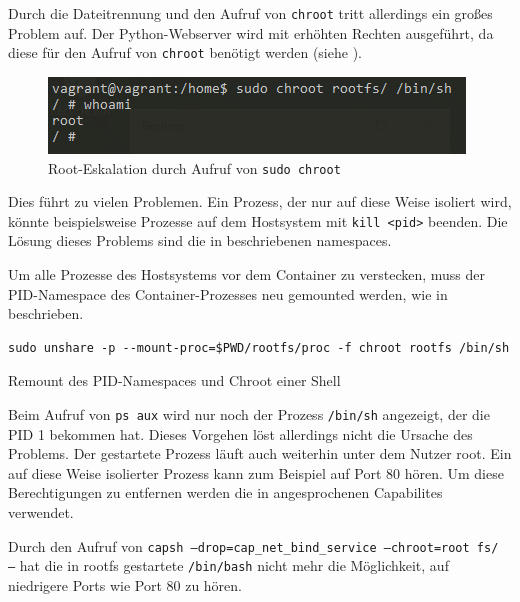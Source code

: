 Durch die Dateitrennung und den Aufruf von \texttt{chroot} tritt allerdings ein großes Problem auf. Der Python-Webserver wird mit erhöhten Rechten ausgeführt, da diese für den Aufruf von \texttt{chroot} benötigt werden (siehe ).

\begin{figure}[h]
	\begin{center}
		\includegraphics[scale=1]{bilder/chroot-whoami-root.png}
		\caption{Root-Eskalation durch Aufruf von \texttt{sudo chroot}}
		\label{fig:chrootWhoami}
	\end{center}
\end{figure}

Dies führt zu vielen Problemen. Ein Prozess, der nur auf diese Weise isoliert wird, könnte beispielsweise Prozesse auf dem Hostsystem mit \texttt{kill <pid>} beenden. Die Lösung dieses Problems sind die in  beschriebenen namespaces.

Um alle Prozesse des Hostsystems vor dem Container zu verstecken, muss der PID-Namespace des Container-Prozesses neu gemounted werden, wie in  beschrieben.
\begin{listing}[h]
	\begin{verbatim}
sudo unshare -p --mount-proc=$PWD/rootfs/proc -f chroot rootfs /bin/sh
	\end{verbatim}
	\caption{Remount des PID-Namespaces und Chroot einer Shell}
	\label{lst:unshareRemount}
\end{listing}

Beim Aufruf von \glqq \texttt{ps aux}\grqq{} wird nur noch der Prozess \texttt{/bin/sh} angezeigt, der die PID 1 bekommen hat. Dieses Vorgehen löst allerdings nicht die Ursache des Problems. Der gestartete Prozess läuft auch weiterhin unter dem Nutzer root. Ein auf diese Weise isolierter Prozess kann zum Beispiel auf Port 80 hören. Um diese Berechtigungen zu entfernen werden die in  angesprochenen Capabilites verwendet.

Durch den Aufruf von \texttt{capsh --drop=cap_net_bind_service --chroot=root fs/ --} hat die in rootfs gestartete \texttt{/bin/bash} nicht mehr die Möglichkeit, auf niedrigere Ports wie Port 80 zu hören.


